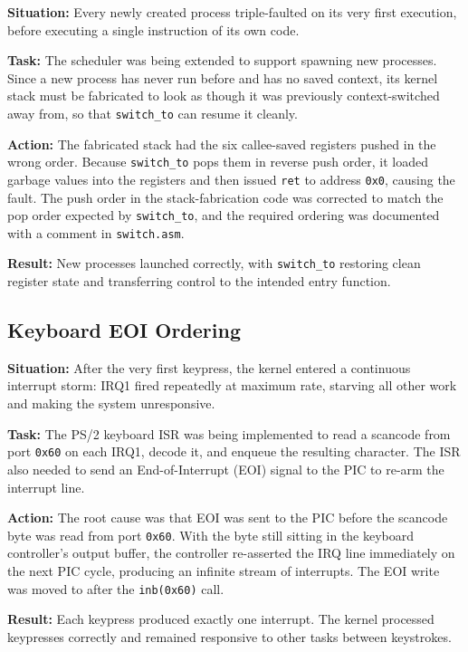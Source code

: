 \documentclass[12pt,a4paper]{article}
\begin{document}
\textbf{Situation:} Every newly created process triple-faulted on its very first execution, before executing a single instruction of its own code.

\textbf{Task:} The scheduler was being extended to support spawning new processes. Since a new process has never run before and has no saved context, its kernel stack must be fabricated to look as though it was previously context-switched away from, so that \texttt{switch\_to} can resume it cleanly.

\textbf{Action:} The fabricated stack had the six callee-saved registers pushed in the wrong order. Because \texttt{switch\_to} pops them in reverse push order, it loaded garbage values into the registers and then issued \texttt{ret} to address \texttt{0x0}, causing the fault. The push order in the stack-fabrication code was corrected to match the pop order expected by \texttt{switch\_to}, and the required ordering was documented with a comment in \texttt{switch.asm}.

\textbf{Result:} New processes launched correctly, with \texttt{switch\_to} restoring clean register state and transferring control to the intended entry function.

\subsection{Keyboard EOI Ordering}

\textbf{Situation:} After the very first keypress, the kernel entered a continuous interrupt storm: IRQ1 fired repeatedly at maximum rate, starving all other work and making the system unresponsive.

\textbf{Task:} The PS/2 keyboard ISR was being implemented to read a scancode from port \texttt{0x60} on each IRQ1, decode it, and enqueue the resulting character. The ISR also needed to send an End-of-Interrupt (EOI) signal to the PIC to re-arm the interrupt line.

\textbf{Action:} The root cause was that EOI was sent to the PIC before the scancode byte was read from port \texttt{0x60}. With the byte still sitting in the keyboard controller's output buffer, the controller re-asserted the IRQ line immediately on the next PIC cycle, producing an infinite stream of interrupts. The EOI write was moved to after the \texttt{inb(0x60)} call.

\textbf{Result:} Each keypress produced exactly one interrupt. The kernel processed keypresses correctly and remained responsive to other tasks between keystrokes.
\end{document}
